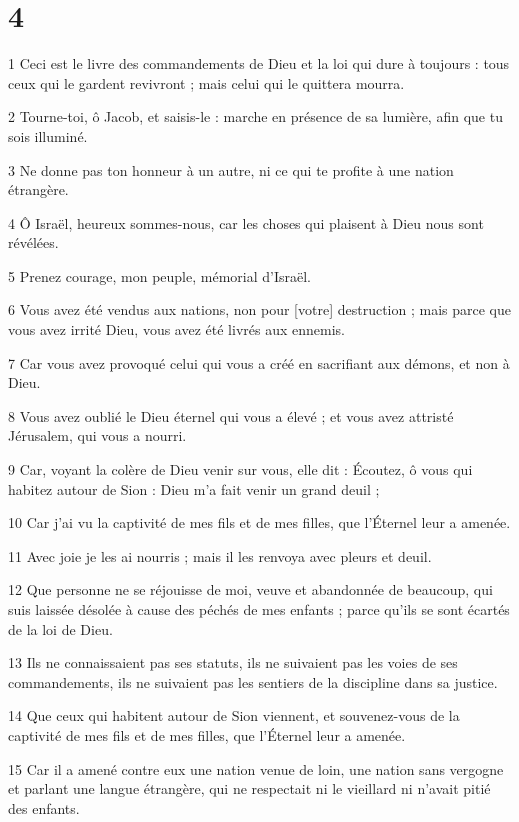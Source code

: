 \chapter{4}

\par 1 Ceci est le livre des commandements de Dieu et la loi qui dure à toujours : tous ceux qui le gardent revivront ; mais celui qui le quittera mourra.
\par 2 Tourne-toi, ô Jacob, et saisis-le : marche en présence de sa lumière, afin que tu sois illuminé.
\par 3 Ne donne pas ton honneur à un autre, ni ce qui te profite à une nation étrangère.
\par 4 Ô Israël, heureux sommes-nous, car les choses qui plaisent à Dieu nous sont révélées.
\par 5 Prenez courage, mon peuple, mémorial d'Israël.
\par 6 Vous avez été vendus aux nations, non pour [votre] destruction ; mais parce que vous avez irrité Dieu, vous avez été livrés aux ennemis.
\par 7 Car vous avez provoqué celui qui vous a créé en sacrifiant aux démons, et non à Dieu.
\par 8 Vous avez oublié le Dieu éternel qui vous a élevé ; et vous avez attristé Jérusalem, qui vous a nourri.
\par 9 Car, voyant la colère de Dieu venir sur vous, elle dit : Écoutez, ô vous qui habitez autour de Sion : Dieu m'a fait venir un grand deuil ;
\par 10 Car j'ai vu la captivité de mes fils et de mes filles, que l'Éternel leur a amenée.
\par 11 Avec joie je les ai nourris ; mais il les renvoya avec pleurs et deuil.
\par 12 Que personne ne se réjouisse de moi, veuve et abandonnée de beaucoup, qui suis laissée désolée à cause des péchés de mes enfants ; parce qu'ils se sont écartés de la loi de Dieu.
\par 13 Ils ne connaissaient pas ses statuts, ils ne suivaient pas les voies de ses commandements, ils ne suivaient pas les sentiers de la discipline dans sa justice.
\par 14 Que ceux qui habitent autour de Sion viennent, et souvenez-vous de la captivité de mes fils et de mes filles, que l'Éternel leur a amenée.
\par 15 Car il a amené contre eux une nation venue de loin, une nation sans vergogne et parlant une langue étrangère, qui ne respectait ni le vieillard ni n'avait pitié des enfants.
